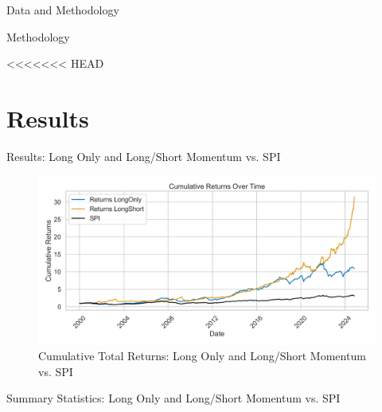 \documentclass[10pt]{beamer}
\begin{document}
\begin{frame}[fragile]{Data and Methodology}
\begin{frame}[fragile]{Methodology}
\end{frame}

<<<<<<< HEAD
\section{Results}
\begin{frame}{Results: Long Only and Long/Short Momentum vs. SPI}
   \begin{figure}
   \caption{Cumulative Total Returns: Long Only and Long/Short Momentum vs. SPI}
        \centering
        \includegraphics[width=\linewidth]{figures/cumulative_returns.png}
    \end{figure}
\end{frame}

\begin{frame}{Summary Statistics: Long Only and Long/Short Momentum vs. SPI}
\begin{table}
\centering
{}
\end{table}
\end{frame}
\end{frame}
\end{document}
